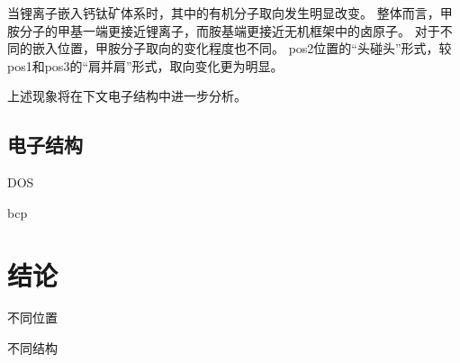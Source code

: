 当锂离子嵌入钙钛矿体系时，其中的有机分子取向发生明显改变。
整体而言，甲胺分子的甲基一端更接近锂离子，而胺基端更接近无机框架中的卤原子。
对于不同的嵌入位置，甲胺分子取向的变化程度也不同。
pos2位置的“头碰头”形式，较pos1和pos3的“肩并肩”形式，取向变化更为明显。

上述现象将在下文电子结构中进一步分析。

\subsection{电子结构}

DOS 

bcp

\section{结论}

不同位置

不同结构


